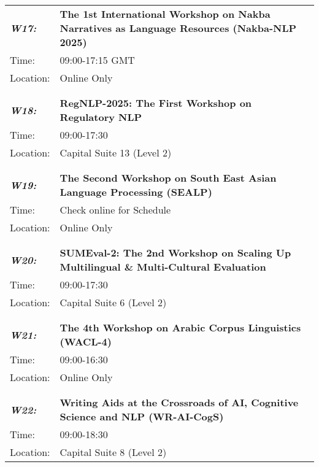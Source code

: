 \begin{longtable}{p{15mm}p{100mm}}
\emph{\textbf{W17:}} & \textbf{The 1st International Workshop on Nakba Narratives as Language Resources (Nakba-NLP 2025)} \\
Time: & 09:00-17:15 GMT \\
Location: & Online Only \\\\
\hline\\
\emph{\textbf{W18:}} & \textbf{RegNLP-2025: The First Workshop on Regulatory NLP} \\
Time: & 09:00-17:30 \\
Location: & Capital Suite 13 (Level 2) \\\\
\hline\\
\emph{\textbf{W19:}} & \textbf{The Second Workshop on South East Asian Language Processing (SEALP)} \\
Time: & Check online for Schedule \\
Location: & Online Only \\\\
\hline\\
\emph{\textbf{W20:}} & \textbf{SUMEval-2: The 2nd Workshop on Scaling Up Multilingual \& Multi-Cultural Evaluation} \\
Time: & 09:00-17:30 \\
Location: & Capital Suite 6 (Level 2) \\\\
\hline\\
\emph{\textbf{W21:}} & \textbf{The 4th Workshop on Arabic Corpus Linguistics (WACL-4)} \\
Time: & 09:00-16:30 \\
Location: & Online Only \\\\
\hline\\
\emph{\textbf{W22:}} & \textbf{Writing Aids at the Crossroads of AI, Cognitive Science and NLP (WR-AI-CogS)} \\
Time: & 09:00-18:30 \\
Location: & Capital Suite 8 (Level 2) \\
\end{longtable}